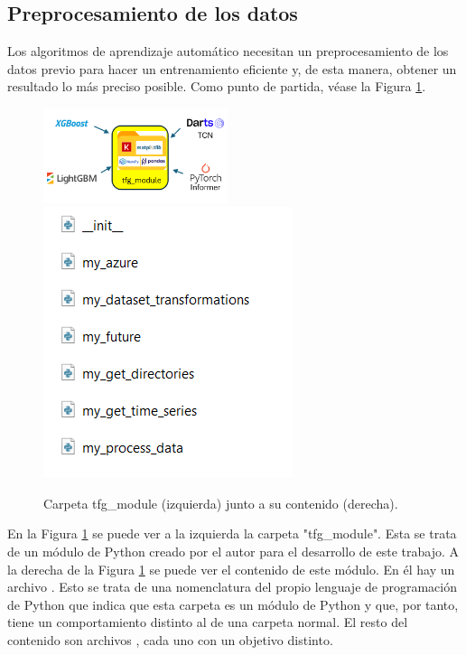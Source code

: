 \subsection{Preprocesamiento de los datos}
Los algoritmos de aprendizaje automático necesitan un preprocesamiento de los datos previo para hacer un entrenamiento eficiente y, de esta manera, obtener un resultado lo más preciso posible. Como punto de partida, véase la Figura \ref{preprocesamiento}.
\begin{figure}[H]
    \centering
    \includegraphics[width = 0.48\textwidth]{imgs/Preprocesamiento.png}
    \includegraphics[scale = 0.9]{imgs/contenido_tfg_module.png}
    \caption{Carpeta tfg\_module (izquierda) junto a su contenido (derecha).}
    \label{preprocesamiento}
\end{figure}

En la Figura \ref{preprocesamiento} se puede ver a la izquierda la carpeta "tfg\_module". Esta se trata de un módulo de Python creado por el autor para el desarrollo de este trabajo. A la derecha de la Figura \ref{preprocesamiento} se puede ver el contenido de este módulo. En él hay un archivo . Esto se trata de una nomenclatura del propio lenguaje de programación de Python que indica que esta carpeta es un módulo de Python y que, por tanto, tiene un comportamiento distinto al de una carpeta normal. El resto del  contenido son archivos , cada uno con un objetivo distinto. 

